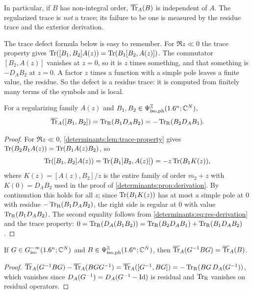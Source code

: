 In particular, if $B$ has non-integral order, $\overline{\operatorname{Tr}}_{A}(B)$ is independent of
$A$. The regularized trace is \emph{not} a trace; its failure to be one is
measured by the residue trace and the exterior derivation.

\begin{discussion}
The trace defect formula below is easy to remember. For $\Re z\ll0$ the
trace property gives $\operatorname{Tr}([B_1,B_2]A(z))=\operatorname{Tr}(B_1[B_2,A(z)])$. The
commutator $[B_2,A(z)]$ vanishes at $z=0$, so it is $z$ times something,
and that something is $-D_AB_2$ at $z=0$. A factor $z$ times a function with
a simple pole leaves a finite value, the residue. So the defect is a
residue trace: it is computed from finitely many terms of the symbols and
is local.
\end{discussion}

\begin{proposition}\label{determinants:prop:trace-defect}
  For a regularizing family $A(z)$ and $B_1,B_2\in\Psi^{\mathbb{Z}}_{\mathrm{iso,ph}}(1.6^n;\mathbb{C}^N)$,
  \begin{equation}\label{determinants:eq:trace-defect}
    \overline{\operatorname{Tr}}_{A}([B_1,B_2])=\operatorname{Tr}_{\mathrm{R}}(B_1D_AB_2)=-\operatorname{Tr}_{\mathrm{R}}(B_2D_AB_1).
  \end{equation}
\end{proposition}
\begin{proof}
  For $\Re z\ll0$, \cref{determinants:lem:trace-property} gives
  $\operatorname{Tr}(B_2B_1A(z))=\operatorname{Tr}(B_1A(z)B_2)$, so
  \begin{equation*}
    \operatorname{Tr}([B_1,B_2]A(z))=\operatorname{Tr}\bigl(B_1[B_2,A(z)]\bigr)=-z\operatorname{Tr}(B_1K(z)),
  \end{equation*}
  where $K(z)=[A(z),B_2]/z$ is the entire family of order $m_2+z$ with
  $K(0)=D_AB_2$ used in the proof of \cref{determinants:prop:derivation}. By
  continuation this holds for all $z$; since $\operatorname{Tr}(B_1K(z))$ has at most a
  simple pole at $0$ with residue $-\operatorname{Tr}_{\mathrm{R}}(B_1D_AB_2)$, the right side is
  regular at $0$ with value $\operatorname{Tr}_{\mathrm{R}}(B_1D_AB_2)$. The second equality follows
  from \eqref{determinants:eq:res-derivation} and the trace property:
  $0=\operatorname{Tr}_{\mathrm{R}}(D_A(B_1B_2))=\operatorname{Tr}_{\mathrm{R}}(B_2D_AB_1)+\operatorname{Tr}_{\mathrm{R}}(B_1D_AB_2)$.
\end{proof}

\begin{corollary}\label{determinants:cor:reg-conjugation}
  If $G\in G^{-\infty}_{\mathrm{iso}}(1.6^n;\mathbb{C}^N)$ and $B\in\Psi^{\mathbb{Z}}_{\mathrm{iso,ph}}(1.6^n;\mathbb{C}^N)$, then
  $\overline{\operatorname{Tr}}_{A}(G^{-1}BG)=\overline{\operatorname{Tr}}_{A}(B)$.
\end{corollary}
\begin{proof}
  $\overline{\operatorname{Tr}}_{A}(G^{-1}BG)-\overline{\operatorname{Tr}}_{A}(BGG^{-1})=\overline{\operatorname{Tr}}_{A}([G^{-1},BG])=-\operatorname{Tr}_{\mathrm{R}}(BG\,D_A(G^{-1}))$,
  which vanishes since $D_A(G^{-1})=D_A(G^{-1}-\operatorname{Id})$ is residual and $\operatorname{Tr}_{\mathrm{R}}$
  vanishes on residual operators.
\end{proof}

